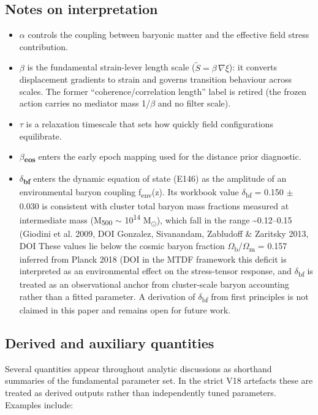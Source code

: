 \documentclass[11pt,a4paper]{article}
\begin{document}
\subsection{Notes on interpretation}
\begin{itemize}
  \item \textbf{$\alpha$} controls the coupling between baryonic matter and the effective field stress contribution.
  \item \textbf{$\beta$} is the fundamental strain-lever length scale (\(\tilde{S} = \beta\,\nabla\xi\)): it converts displacement gradients to strain and governs transition behaviour across scales. The former ``coherence/\allowbreak{}correlation length'' label is retired (the frozen action carries no mediator mass 1/\allowbreak{}$\beta$ and no filter scale).
  \item \textbf{$\tau$} is a relaxation timescale that sets how quickly field configurations equilibrate.
  \item \textbf{$\beta$\textsubscript{eos}} enters the early epoch mapping used for the distance prior diagnostic.
  \item \textbf{$\delta$\textsubscript{bf}} enters the dynamic equation of state (E146) as the amplitude of an environmental baryon coupling f\textsubscript{env}(z). Its workbook value $\delta$\textsubscript{bf} = 0.150 $\pm$ 0.030 is consistent with cluster total baryon mass fractions measured at intermediate mass (M\textsubscript{500} $\sim$ 10\textsuperscript{14} M\textsubscript{$\odot$}), which fall in the range \~{}0.12--0.15 (Giodini et al. 2009, DOI {\small\protect{}} Gonzalez, Sivanandam, Zabludoff \& Zaritsky 2013, DOI {\small\protect{}} These values lie below the cosmic baryon fraction $\Omega$\textsubscript{b}/$\Omega$\textsubscript{m} = 0.157 inferred from Planck 2018 (DOI {\small\protect{}} in the MTDF framework this deficit is interpreted as an environmental effect on the stress-tensor response, and $\delta$\textsubscript{bf} is treated as an observational anchor from cluster-scale baryon accounting rather than a fitted parameter. A derivation of $\delta$\textsubscript{bf} from first principles is not claimed in this paper and remains open for future work.
\end{itemize}

\subsection{Derived and auxiliary quantities}
Several quantities appear throughout analytic discussions as shorthand summaries of the fundamental parameter set. In the strict V18 artefacts these are treated as derived outputs rather than independently tuned parameters. Examples include:
\end{document}
